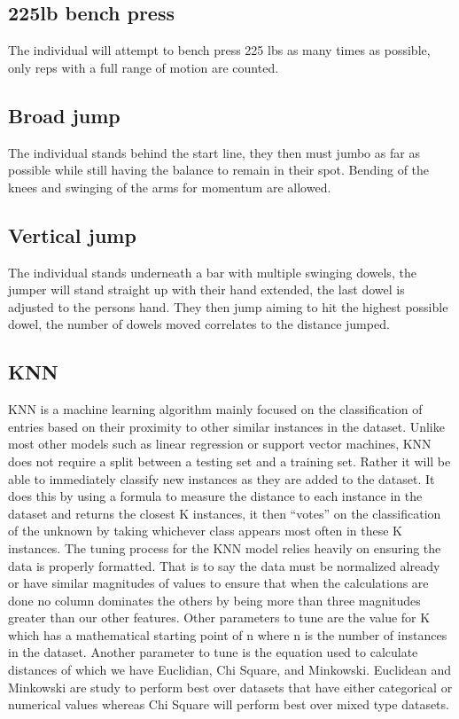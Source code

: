 \documentclass[confrence]{IEEEtran}
\begin{document}
\subsection*{225lb bench press}
The individual will attempt to bench press 225 lbs as many times as possible, only reps with a full range of motion are counted.
\\
\subsection*{Broad jump}
The individual stands behind the start line, they then must jumbo as far as possible while still having the balance to remain in their spot. Bending of the knees and swinging of the arms for momentum are allowed.
\\
\subsection*{Vertical jump}
The individual stands underneath a bar with multiple swinging dowels, the jumper will stand straight up with their hand extended, the last dowel is adjusted to the persons hand. They then jump aiming to hit the highest possible dowel, the number of dowels moved correlates to the distance jumped.
\\
\subsection*{KNN}
KNN is a machine learning algorithm mainly focused on the classification of entries based on their proximity to other similar instances in the dataset. 
Unlike most other models such as linear regression or support vector machines, KNN does not require a split between a testing set and a training set. 
Rather it will be able to immediately classify new instances as they are added to the dataset. 
It does this by using a formula to measure the distance to each instance in the dataset and returns the closest K instances, it then “votes” on the classification of the unknown by taking whichever class appears most often in these K instances. 
The tuning process for the KNN model relies heavily on ensuring the data is properly formatted. 
That is to say the data must be normalized already or have similar magnitudes of values to ensure that when the calculations are done no column dominates the others by being more than three magnitudes greater than our other features. Other parameters to tune are the value for K which has a mathematical starting point of n where n is the number of instances in the dataset. 
Another parameter to tune is the equation used to calculate distances of which we have Euclidian, Chi Square, and Minkowski. Euclidean and Minkowski are study to perform best over datasets that have either categorical or numerical values whereas Chi Square will perform best over mixed type datasets.
\\
\end{document}
